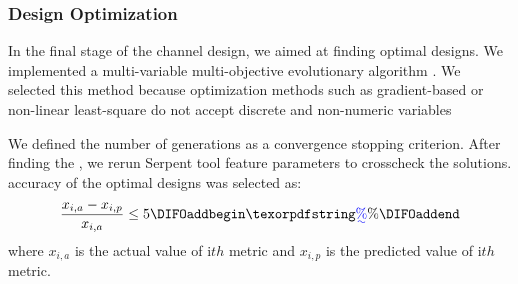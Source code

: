 \subsubsection{Design Optimization}

    In the final stage of the channel design, we aimed at finding \DIFdelbegin {}\DIFdelend optimal designs. We implemented a multi-variable multi-objective evolutionary algorithm \DIFaddbegin {}\DIFaddend . We selected this method because optimization methods such as gradient-based or non-linear least-square do not accept discrete and non-numeric variables\DIFdelbegin {}\DIFdelend \DIFaddbegin {}\DIFaddend 

    We defined the number of generations as a convergence stopping criterion. After finding the \DIFdelbegin {}\DIFdelend \DIFaddbegin {}\DIFaddend , we rerun Serpent tool \DIFdelbegin {}\DIFdelend \DIFaddbegin {}\DIFaddend feature parameters to crosscheck the solutions. \DIFdelbegin {}\DIFdelend \DIFaddbegin {}\DIFaddend accuracy of the optimal designs was selected as:
    \begin{eqnarray}\label{Eq0}
    \dfrac{x_{i,a}-x_{i,p}}{x_{i,a}} \leq 5%
\DIFaddbegin \DIFadd{\%
    }\DIFaddend \end{eqnarray}
    where $x_{i,a}$ is the actual value of i$th$ metric and $x_{i,p}$ is the predicted value of i$th$ metric.

